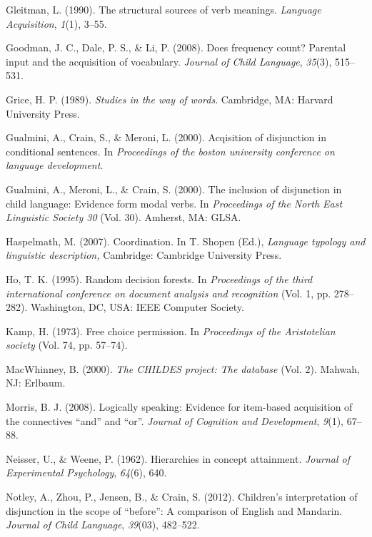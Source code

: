 \documentclass[floatsintext,man]{apa6}
\theoremstyle{definition}
\theoremstyle{definition}
\theoremstyle{definition}
\theoremstyle{remark}
\begin{document}
\hypertarget{ref-gleitman1990structural}{}
Gleitman, L. (1990). The structural sources of verb meanings.
\emph{Language Acquisition}, \emph{1}(1), 3--55.

\hypertarget{ref-goodman2008does}{}
Goodman, J. C., Dale, P. S., \& Li, P. (2008). Does frequency count?
Parental input and the acquisition of vocabulary. \emph{Journal of Child
Language}, \emph{35}(3), 515--531.

\hypertarget{ref-grice1989studies}{}
Grice, H. P. (1989). \emph{Studies in the way of words}. Cambridge, MA:
Harvard University Press.

\hypertarget{ref-gualmini2000}{}
Gualmini, A., Crain, S., \& Meroni, L. (2000). Acqisition of disjunction
in conditional sentences. In \emph{Proceedings of the boston university
conference on language development}.

\hypertarget{ref-gualmini2000inclusion}{}
Gualmini, A., Meroni, L., \& Crain, S. (2000). The inclusion of
disjunction in child language: Evidence form modal verbs. In
\emph{Proceedings of the North East Linguistic Society 30} (Vol. 30).
Amherst, MA: GLSA.

\hypertarget{ref-haspelmath2007}{}
Haspelmath, M. (2007). Coordination. In T. Shopen (Ed.), \emph{Language
typology and linguistic description,} Cambridge: Cambridge University
Press.

\hypertarget{ref-ho1995random}{}
Ho, T. K. (1995). Random decision forests. In \emph{Proceedings of the
third international conference on document analysis and recognition}
(Vol. 1, pp. 278--282). Washington, DC, USA: IEEE Computer Society.

\hypertarget{ref-kamp1973free}{}
Kamp, H. (1973). Free choice permission. In \emph{Proceedings of the
Aristotelian society} (Vol. 74, pp. 57--74).

\hypertarget{ref-macwhinney2000childes}{}
MacWhinney, B. (2000). \emph{The CHILDES project: The database} (Vol.
2). Mahwah, NJ: Erlbaum.

\hypertarget{ref-morris2008logically}{}
Morris, B. J. (2008). Logically speaking: Evidence for item-based
acquisition of the connectives ``and'' and ``or''. \emph{Journal of
Cognition and Development}, \emph{9}(1), 67--88.

\hypertarget{ref-neisser1962hierarchies}{}
Neisser, U., \& Weene, P. (1962). Hierarchies in concept attainment.
\emph{Journal of Experimental Psychology}, \emph{64}(6), 640.

\hypertarget{ref-notley2012children}{}
Notley, A., Zhou, P., Jensen, B., \& Crain, S. (2012). Children's
interpretation of disjunction in the scope of ``before'': A comparison
of English and Mandarin. \emph{Journal of Child Language},
\emph{39}(03), 482--522.
\end{document}
